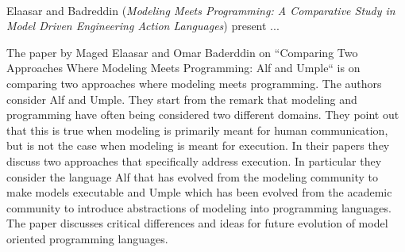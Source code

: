 

\ \hline \ %

Elaasar and Badreddin
\cite{isola-2016-elaasar}
({\em Modeling Meets Programming: A Comparative Study in
Model Driven Engineering Action Languages})
present ...


The paper by Maged Elaasar and Omar Baderddin  on “Comparing Two Approaches Where Modeling Meets Programming: Alf and Umple“ is on comparing two approaches where modeling meets programming. The authors consider Alf and Umple. They start from the remark that modeling and programming have often being considered two different domains. They point out that this is true when modeling is primarily meant for human communication, but is not the case when modeling is meant for execution. In their papers they discuss two approaches that specifically address execution. In particular they consider the language Alf that has evolved from the modeling community to make models executable and Umple which has been evolved from the academic community to introduce abstractions of modeling into programming languages. The paper discusses critical differences and ideas for future evolution of model oriented programming languages.
 